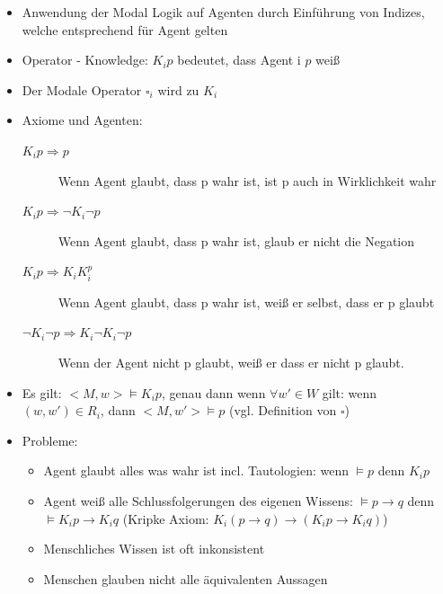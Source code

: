 \documentclass{article} %
\begin{document}
\begin{itemize}
\begin{itemize}
\begin{description}
			\end{description}
			
			\item Anwendung der Modal Logik auf Agenten durch Einführung von Indizes, welche entsprechend für Agent gelten
			\item Operator - Knowledge: $K_ip$ bedeutet, dass Agent i $p$ weiß
			\item Der Modale Operator $\square_i$ wird zu $K_i$\\
			
			\item Axiome und Agenten:
			\begin{description}
				\item[$K_{i}p \Rightarrow p$] Wenn Agent glaubt, dass p wahr ist, ist p auch in Wirklichkeit wahr
				\item[$K_{i}p \Rightarrow \neg K_{i}\neg p$] Wenn Agent glaubt, dass p wahr ist, glaub er nicht die Negation
				\item[$K_{i}p \Rightarrow K_{i}K_{i}^p$] Wenn Agent glaubt, dass p wahr ist, weiß er selbst, dass er p glaubt
				\item[$\neg K_{i}\neg p \Rightarrow K_{i}\neg K_{i}\neg p$] Wenn der Agent nicht p glaubt, weiß er dass er nicht p glaubt.\\
				
			\end{description}
			\item Es gilt: $<M,w> \vDash K_i p$, genau dann wenn $\forall w' \in W$ gilt: wenn $(w,w') \in R_i$, dann $<M,w'> \vDash p$ (vgl. Definition von $\square$)
			\item Probleme:
			\begin{itemize}
				\item Agent glaubt alles was wahr ist incl. Tautologien: wenn $\vDash p$ denn $K_i p$
				\item Agent weiß alle Schlussfolgerungen des eigenen Wissens: $\vDash p \rightarrow q$ denn $\vDash K_i p \rightarrow K_i q$ (Kripke Axiom: $K_i(p\rightarrow q) \rightarrow (K_i p \rightarrow K_i q)$)
				\item Menschliches Wissen ist oft inkonsistent
				\item Menschen glauben nicht alle äquivalenten Aussagen
			\end{itemize}
		\end{itemize}
	\end{itemize}
\end{document}
